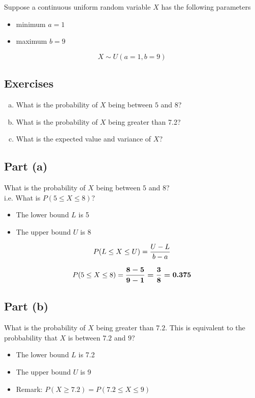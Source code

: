 \documentclass[a4paper,12pt]{article}
\begin{document}
\large 
\noindent Suppose a continuous uniform random variable $X$ has the following parameters
\begin{itemize}
\item minimum $a=1$
\item maximum $b=9$
\end{itemize}
\[ X \sim U(a=1,b=9)\]

\medskip
\subsection*{Exercises}
\begin{enumerate}[(a)]
    \item What is the probability of $X$ being between $5$ and $8$?
    \item What is the probability of $X$ being greater than 7.2?
    \item What is the expected value and variance of $X$?
\end{enumerate}
\medskip
\subsection*{Part (a)}

What is the probability of $X$ being between $5$ and $8$? \\i.e. What is $P( 5 \leq X \leq 8 )$?


\begin{itemize}\item The lower bound $L$ is 5
\item The upper bound $U$ is 8
\end{itemize}


\[
P( L \leq X \leq U ) = { U - L \over b - a}
\]

\[
P( 5 \leq X \leq 8 ) = \boldsymbol{{ 8 - 5 \over 9 - 1} = { 3 \over 8} = 0.375}
\]
\subsection*{Part (b)}

What is the probability of $X$ being greater than $7.2$. This is equivalent to the probbability that $X$ is between $7.2$ and $9$?
\begin{itemize}\item The lower bound $L$ is 7.2
\item The upper bound $U$ is 9

\item Remark: $P( X \geq 7.2) = P(7.2 \leq X \leq 9 )$
\end{itemize}
\end{document}
